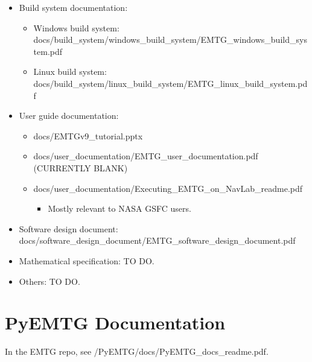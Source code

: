 \documentclass[11pt]{article}
\begin{document}
\begin{itemize}
	\item Build system documentation:
	\begin{itemize}
		\item Windows build system: docs/build\_system/windows\_build\_system/EMTG\_windows\_build\_system.pdf
		\item Linux build system: docs/build\_system/linux\_build\_system/EMTG\_linux\_build\_system.pdf
	\end{itemize}
	\item User guide documentation: 
	\begin{itemize}
		\item docs/EMTGv9\_tutorial.pptx
		\item docs/user\_documentation/EMTG\_user\_documentation.pdf (CURRENTLY BLANK)
		\item docs/user\_documentation/Executing\_EMTG\_on\_NavLab\_readme.pdf
		\begin{itemize}
			\item Mostly relevant to \ac{NASA} \ac{GSFC} users.
		\end{itemize}
	\end{itemize}
	\item Software design document: docs/software\_design\_document/EMTG\_software\_design\_document.pdf
	\item Mathematical specification: TO DO.
	\item Others: TO DO.
\end{itemize}

\section{PyEMTG Documentation}
\label{sec:pyemtg_documentation}

In the \ac{EMTG} repo, see /PyEMTG/docs/PyEMTG\_docs\_readme.pdf.
	

	
	
\end{document}
